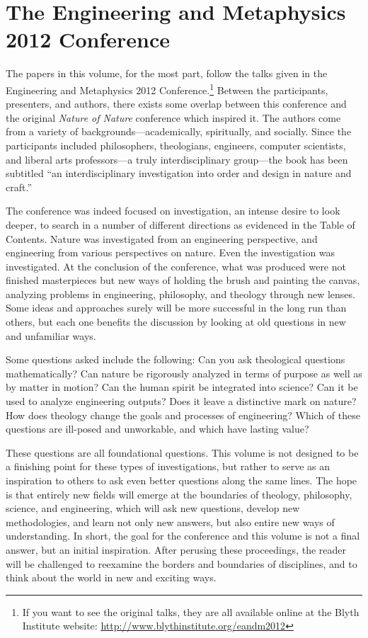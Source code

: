 \section[The E\&M 2012 Conference]{The Engineering and Metaphysics 2012 Conference}

The papers in this volume, for the most part, follow the talks given in the Engineering and Metaphysics 2012 Conference.\footnote{If you want to see the original talks, they are all available online at the Blyth Institute website: \url{http://www.blythinstitute.org/eandm2012}}  Between the participants, presenters, and authors, there exists some overlap between this conference and the original \textit{Nature of Nature} conference which inspired it.  The authors come from a variety of backgrounds---academically, spiritually, and socially.  Since the participants included philosophers, theologians, engineers, computer scientists, and liberal arts professors---a truly interdisciplinary group---the book has been subtitled ``an interdisciplinary investigation into order and design in nature and craft.''  

The conference was indeed focused on investigation, an intense desire to look deeper, to search in a number of different directions as evidenced in the Table of Contents.  Nature was investigated from an engineering perspective, and engineering from various perspectives on nature.  Even the investigation was investigated.  At the conclusion of the conference, what
was produced were not finished masterpieces but new ways of holding the brush and painting the canvas, analyzing problems in engineering, philosophy, and theology through new lenses.  Some ideas and approaches surely will be more successful in the long run than others, but each one benefits the discussion by looking at old questions in new and unfamiliar ways.

Some questions asked include the following: Can you ask theological questions mathematically?  Can nature be rigorously analyzed in terms of purpose as well as by matter in motion?  Can the human spirit be integrated into science?  Can it be used to analyze engineering outputs?  Does it leave a distinctive mark on nature?  How does theology change the goals and processes of engineering?  Which of these questions are ill-posed and unworkable, and which have lasting value?

These questions are all foundational questions.  This volume is not designed to be a finishing point for these types of investigations, but rather to serve as an inspiration to others to ask even better questions along the same lines.  The hope is that entirely new fields will emerge at the boundaries of theology, philosophy, science, and engineering, which will ask new questions, develop new methodologies, and learn not only new answers, but also entire new ways of understanding.  In short, the goal for the conference and this volume is not a final answer, but an initial inspiration.  After perusing these proceedings, the reader will be challenged to reexamine the borders and boundaries of disciplines, and to think about the world in new and exciting ways.

